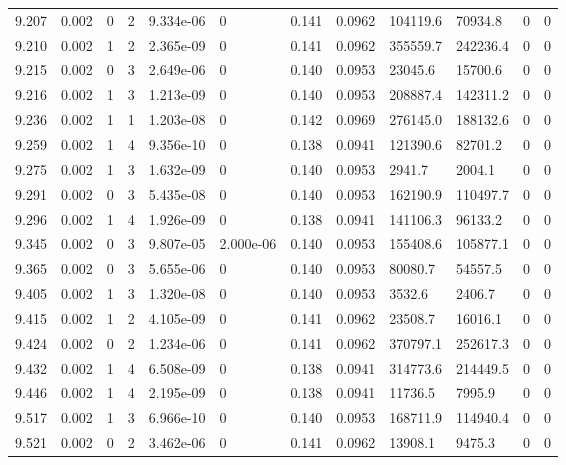 \documentclass[preview]{standalone}
\begin{document}
{{{{{{{{{{{{{\begin{tabular}{L{1.2cm}C{1.2cm} C{0.3cm}C{0.5cm} C{1.4cm}C{1.4cm} C{1.4cm}C{1.4cm} C{1.6cm}C{1.6cm} C{1.6cm}C{1.6cm}}
  9.207  &  0.002  & 0     &  2 &  9.334e-06  & 0  &  0.141&   0.0962& 104119.6 & 70934.8   &  0 & 0  \\ 
  9.210  &  0.002  & 1     &  2 &  2.365e-09  & 0  &  0.141&   0.0962& 355559.7 & 242236.4   &  0 & 0  \\ 
  9.215  &  0.002  & 0     &  3 &  2.649e-06  & 0  &  0.140&   0.0953& 23045.6 & 15700.6   &  0 & 0  \\ 
  9.216  &  0.002  & 1     &  3 &  1.213e-09  & 0  &  0.140&   0.0953& 208887.4 & 142311.2   &  0 & 0  \\ 
  9.236  &  0.002  & 1     &  1 &  1.203e-08  & 0  &  0.142&   0.0969& 276145.0 & 188132.6   &  0 & 0  \\ 
  9.259  &  0.002  & 1     &  4 &  9.356e-10  & 0  &  0.138&   0.0941& 121390.6 & 82701.2   &  0 & 0  \\ 
  9.275  &  0.002  & 1     &  3 &  1.632e-09  & 0  &  0.140&   0.0953& 2941.7 & 2004.1   &  0 & 0  \\ 
  9.291  &  0.002  & 0     &  3 &  5.435e-08  & 0  &  0.140&   0.0953& 162190.9 & 110497.7   &  0 & 0  \\ 
  9.296  &  0.002  & 1     &  4 &  1.926e-09  & 0  &  0.138&   0.0941& 141106.3 & 96133.2   &  0 & 0  \\ 
  9.345  &  0.002  & 0     &  3 &  9.807e-05  & 2.000e-06  &  0.140&   0.0953& 155408.6 & 105877.1   &  0 & 0  \\ 
  9.365  &  0.002  & 0     &  3 &  5.655e-06  & 0  &  0.140&   0.0953& 80080.7 & 54557.5   &  0 & 0  \\ 
  9.405  &  0.002  & 1     &  3 &  1.320e-08  & 0  &  0.140&   0.0953& 3532.6 & 2406.7   &  0 & 0  \\ 
  9.415  &  0.002  & 1     &  2 &  4.105e-09  & 0  &  0.141&   0.0962& 23508.7 & 16016.1   &  0 & 0  \\ 
  9.424  &  0.002  & 0     &  2 &  1.234e-06  & 0  &  0.141&   0.0962& 370797.1 & 252617.3   &  0 & 0  \\ 
  9.432  &  0.002  & 1     &  4 &  6.508e-09  & 0  &  0.138&   0.0941& 314773.6 & 214449.5   &  0 & 0  \\ 
  9.446  &  0.002  & 1     &  4 &  2.195e-09  & 0  &  0.138&   0.0941& 11736.5 & 7995.9   &  0 & 0  \\ 
  9.517  &  0.002  & 1     &  3 &  6.966e-10  & 0  &  0.140&   0.0953& 168711.9 & 114940.4   &  0 & 0  \\ 
  9.521  &  0.002  & 0     &  2 &  3.462e-06  & 0  &  0.141&   0.0962& 13908.1 & 9475.3   &  0 & 0  \\ 

\end{tabular}}}}}}}}}}}}}}
\end{document}
